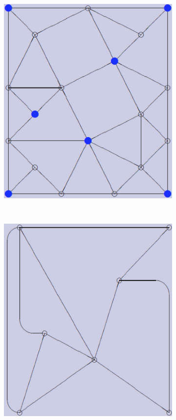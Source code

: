 \documentclass[12pt]{article}
\begin{document}
\begin{figure}[tb]
\begin{subfigure}[b]{0.2\textwidth}
      \includegraphics[width=\textwidth]{img/contract_kernel7}
      \caption{}\label{fig:contract_kernel6}
  \end{subfigure}
  ~
  \begin{subfigure}[b]{0.2\textwidth}
      \includegraphics[width=\textwidth]{img/contract_kernel1}

\end{subfigure}
\end{figure}
\end{document}
